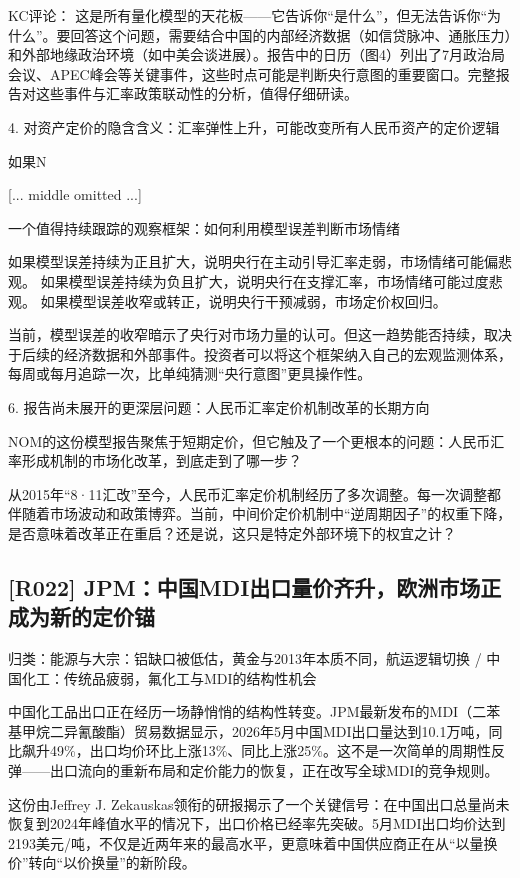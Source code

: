 \documentclass[11pt]{ctexart}
\begin{document}
KC评论： 这是所有量化模型的天花板——它告诉你“是什么”，但无法告诉你“为什么”。要回答这个问题，需要结合中国的内部经济数据（如信贷脉冲、通胀压力）和外部地缘政治环境（如中美会谈进展）。报告中的日历（图4）列出了7月政治局会议、APEC峰会等关键事件，这些时点可能是判断央行意图的重要窗口。完整报告对这些事件与汇率政策联动性的分析，值得仔细研读。

4. 对资产定价的隐含含义：汇率弹性上升，可能改变所有人民币资产的定价逻辑

如果N

[... middle omitted ...]

 一个值得持续跟踪的观察框架：如何利用模型误差判断市场情绪

如果模型误差持续为正且扩大，说明央行在主动引导汇率走弱，市场情绪可能偏悲观。 如果模型误差持续为负且扩大，说明央行在支撑汇率，市场情绪可能过度悲观。 如果模型误差收窄或转正，说明央行干预减弱，市场定价权回归。

当前，模型误差的收窄暗示了央行对市场力量的认可。但这一趋势能否持续，取决于后续的经济数据和外部事件。投资者可以将这个框架纳入自己的宏观监测体系，每周或每月追踪一次，比单纯猜测“央行意图”更具操作性。

6. 报告尚未展开的更深层问题：人民币汇率定价机制改革的长期方向

NOM的这份模型报告聚焦于短期定价，但它触及了一个更根本的问题：人民币汇率形成机制的市场化改革，到底走到了哪一步？

从2015年“8·11汇改”至今，人民币汇率定价机制经历了多次调整。每一次调整都伴随着市场波动和政策博弈。当前，中间价定价机制中“逆周期因子”的权重下降，是否意味着改革正在重启？还是说，这只是特定外部环境下的权宜之计？

\subsection{[R022] JPM：中国MDI出口量价齐升，欧洲市场正成为新的定价锚}
{\small\color{refgray}归类：能源与大宗：铝缺口被低估，黄金与2013年本质不同，航运逻辑切换 / 中国化工：传统品疲弱，氟化工与MDI的结构性机会}

中国化工品出口正在经历一场静悄悄的结构性转变。JPM最新发布的MDI（二苯基甲烷二异氰酸酯）贸易数据显示，2026年5月中国MDI出口量达到10.1万吨，同比飙升49\%，出口均价环比上涨13\%、同比上涨25\%。这不是一次简单的周期性反弹——出口流向的重新布局和定价能力的恢复，正在改写全球MDI的竞争规则。

这份由Jeffrey J. Zekauskas领衔的研报揭示了一个关键信号：在中国出口总量尚未恢复到2024年峰值水平的情况下，出口价格已经率先突破。5月MDI出口均价达到2193美元/吨，不仅是近两年来的最高水平，更意味着中国供应商正在从“以量换价”转向“以价换量”的新阶段。
\end{document}
